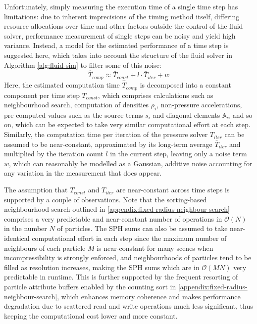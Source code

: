 \documentclass[oneside, a4paper]{book}
\newcommand\br[1]{\left(#1\right)}
\begin{document}
    Unfortunately, simply measuring the execution time of a single time step has limitations: due to inherent imprecisions of the timing method itself, differing resource allocations over time and other factors outside the control of the fluid solver, performance measurement of single steps can be noisy and yield high variance. Instead, a model for the estimated performance of a time step is suggested here, which takes into account the structure of the fluid solver in Algorithm \ref{alg:fluid-sim} to filter some of this noise:
    \begin{equation}\label{eq:perf-cost-model}
      \hat{T}_{comp} \approx \bar{T}_{const} + l \cdot \bar{T}_{iter} + w
    \end{equation}
    Here, the estimated computation time $\hat{T}_{comp}$ is decomposed into a constant component per time step $T_{const}$, which comprises calculations such as neighbourhood search, computation of densities $\rho_i$, non-pressure accelerations, pre-computed values such as the source terms $s_i$ and diagonal elements $\mathds{A}_{ii}$ and so on, which can be expected to take very similar computational effort at each step. 
    Similarly, the computation time per iteration of the pressure solver $T_{iter}$ can be assumed to be near-constant, approximated by its long-term average $\bar{T}_{iter}$ and multiplied by the iteration count $l$ in the current step, leaving only a noise term $w$, which can reasonably be modelled as a Gaussian, additive noise accounting for any variation in the measurement that does appear.

    
    The assumption that $T_{const}$ and $T_{iter}$ are near-constant across time steps is supported by a couple of observations. Note that the sorting-based neighbourhood search outlined in \autoref{appendix:fixed-radius-neighbour-search} comprises a very predictable and near-constant number of operations in $\mathcal{O}\br{N}$ in the number $N$ of particles. The SPH sums can also be assumed to take near-identical computational effort in each step since the maximum number of neighbours of each particle $M$ is near-constant for many scenes when incompressibility is strongly enforced, and neighbourhoods of particles tend to be filled as resolution increases, making the SPH sums which are in $\mathcal{O}\br{MN}$ very predictable in runtime. This is further supported by the frequent resorting of particle attribute buffers enabled by the counting sort in \autoref{appendix:fixed-radius-neighbour-search}, which enhances memory coherence and makes performance degradation due to scattered read and write operations much less significant, thus keeping the computational cost lower and more constant. 
    
\end{document}
